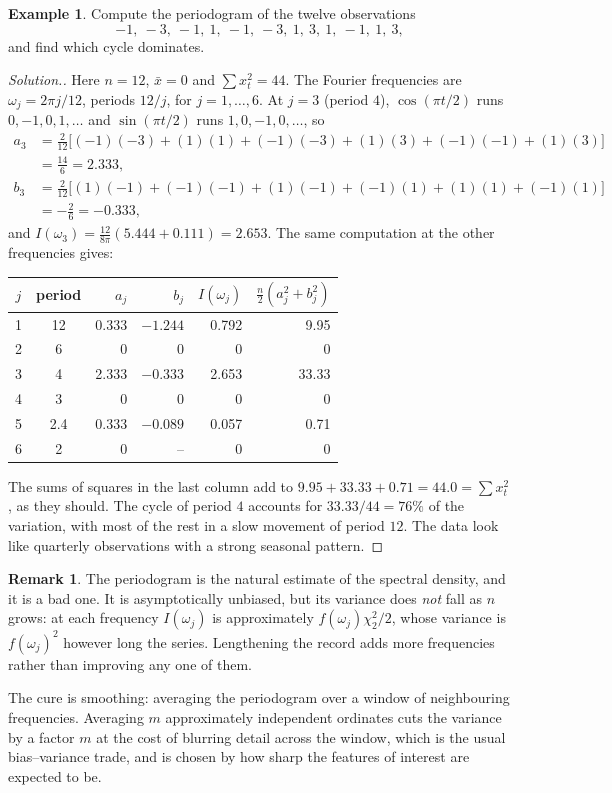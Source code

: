 \documentclass[11pt,a4paper]{article}
\theoremstyle{definition}
\newtheorem{exa}[thm]{Example}
\newtheorem*{remark}{Remark}
\newenvironment{solution}
  {\renewcommand{\qedsymbol}{}\begin{proof}[\textit{Solution}.]}
  {\end{proof}}
\begin{document}
\begin{exa}\label{exa:periodogram}
Compute the periodogram of the twelve observations
\[
-1, \ -3, \ -1, \ 1, \ -1, \ -3, \ 1, \ 3, \ 1, \ -1, \ 1, \ 3 ,
\]
and find which cycle dominates.
\end{exa}

\begin{solution}
Here $n = 12$, $\bar x = 0$ and $\sum x_t^2 = 44$. The Fourier frequencies are $\omega_j = 2\pi j/12$, periods $12/j$, for $j = 1, \dots, 6$. At $j = 3$
(period $4$), $\cos(\pi t/2)$ runs $0, -1, 0, 1, \dots$ and $\sin(\pi t/2)$ runs $1, 0, -1, 0, \dots$, so
\begin{align*}
a_3 &= \tfrac2{12}\bigl[(-1)(-3) + (1)(1) + (-1)(-3) + (1)(3) + (-1)(-1) + (1)(3)\bigr] \\
&= \tfrac{14}6 = 2.333 , \\
b_3 &= \tfrac2{12}\bigl[(1)(-1) + (-1)(-1) + (1)(-1) + (-1)(1) + (1)(1) + (-1)(1)\bigr] \\
&= -\tfrac26 = -0.333 ,
\end{align*}
and $I(\omega_3) = \frac{12}{8\pi}(5.444 + 0.111) = 2.653$. The same computation at the other frequencies gives:
\begin{center}
\begin{tabular}{ccrrrr}
$j$ & period & $a_j$ & $b_j$ & $I(\omega_j)$ & $\frac n2(a_j^2 + b_j^2)$ \\
\hline
1 & 12 & 0.333 & $-1.244$ & 0.792 & 9.95 \\
2 & 6 & 0 & 0 & 0 & 0 \\
3 & 4 & 2.333 & $-0.333$ & 2.653 & 33.33 \\
4 & 3 & 0 & 0 & 0 & 0 \\
5 & 2.4 & 0.333 & $-0.089$ & 0.057 & 0.71 \\
6 & 2 & 0 & -- & 0 & 0 \\
\end{tabular}
\end{center}
The sums of squares in the last column add to $9.95 + 33.33 + 0.71 = 44.0 = \sum x_t^2$, as they should. The cycle of period $4$ accounts for $33.33/44 = 76\%$
of the variation, with most of the rest in a slow movement of period $12$. The data look like quarterly
observations with a strong seasonal pattern.
\end{solution}

\begin{remark}
The periodogram is the natural estimate of the spectral density, and it is a bad one. It is asymptotically
unbiased, but its variance does \emph{not} fall as $n$ grows: at each frequency $I(\omega_j)$ is approximately $f(\omega_j)\chi^2_2/2$, whose
variance is $f(\omega_j)^2$ however long the series. Lengthening the record adds more frequencies rather than
improving any one of them.

The cure is smoothing: averaging the periodogram over a window of neighbouring frequencies. Averaging $m$
approximately independent ordinates cuts the variance by a factor $m$ at the cost of blurring detail across the
window, which is the usual bias--variance trade, and is chosen by how sharp the features of interest are
expected to be.
\end{remark}
\end{document}
